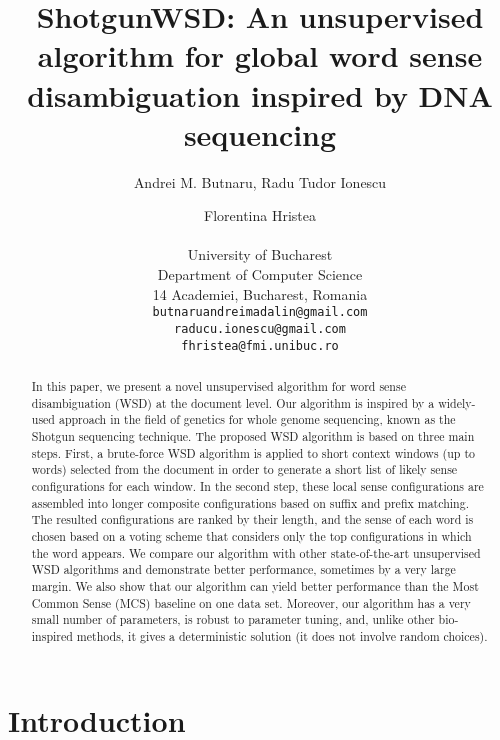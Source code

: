 \documentclass[11pt]{article}
\title{ShotgunWSD: An unsupervised algorithm for global word sense disambiguation inspired by DNA sequencing}
\author{Andrei M. Butnaru, Radu Tudor Ionescu \and Florentina Hristea\\
  \\
  University of Bucharest\\
  Department of Computer Science\\
  14 Academiei, Bucharest, Romania\\
  {\tt butnaruandreimadalin@gmail.com}\\   
  {\tt raducu.ionescu@gmail.com}\\
  {\tt fhristea@fmi.unibuc.ro}  
}
\date{}
\begin{document}
\maketitle
\begin{abstract}
In this paper, we present a novel unsupervised algorithm for word sense disambiguation (WSD) at the document level. Our algorithm is inspired by a widely-used approach in the field of genetics for whole genome sequencing, known as the Shotgun sequencing technique. The proposed WSD algorithm is based on three main steps. First, a brute-force WSD algorithm is applied to short context windows (up to  words) selected from the document in order to generate a short list of likely sense configurations for each window. In the second step, these local sense configurations are assembled into longer composite configurations based on suffix and prefix matching. The resulted configurations are ranked by their length, and the sense of each word is chosen based on a voting scheme that considers only the top  configurations in which the word appears. We compare our algorithm with other state-of-the-art unsupervised WSD algorithms and demonstrate better performance, sometimes by a very large margin. We also show that our algorithm can yield better performance than the Most Common Sense (MCS) baseline on one data set. Moreover, our algorithm has a very small number of parameters, is robust to parameter tuning, and, unlike other bio-inspired methods, it gives a deterministic solution (it does not involve random choices). 
\end{abstract}

\section{Introduction}
\end{document}

